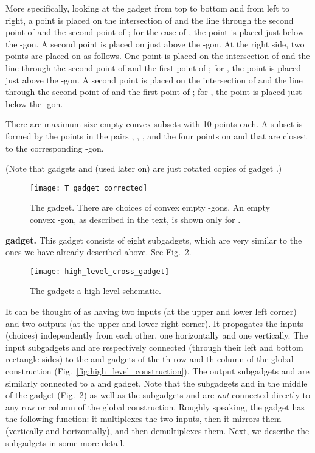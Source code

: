 \documentclass[11pt,a4paper]{article}
\begin{document}
More specifically, looking at the gadget from top to bottom and from left to right, a point is placed on the intersection of  and the line through the second point of  and the second point of ; for the case of , the point is placed just below the -gon. A second point is placed on  just above the -gon. At the right side, two points are placed on  as follows. One point is placed on the intersection of  and the line through the second point of  and the first point of ; for , the point is placed just above the -gon. A second point is placed on the intersection of  and the line through the second point of  and the first point of ; for , the point is placed just below the -gon.

There are  maximum size empty convex subsets with 10 points each. A subset is formed by the points in the pairs , , , and the four points on  and  that are closest to the corresponding -gon. 

(Note that gadgets  and  (used later on) are just rotated copies of gadget .)
\begin{figure}
\centering
	\texttt{[image: T\_gadget\_corrected]}
	\caption{The  gadget. There are  choices of convex empty -gons. An empty convex -gon, as described in the text, is shown only for .}
	\label{fig:T_gadget}
\end{figure}

\medskip
\noindent
{ \textbf{gadget.}} This gadget consists of eight subgadgets, which are very similar to the ones we have already described above. See Fig.~\ref{fig:high_level_cross_gadget}.
\begin{figure}[h]
\centering
	\texttt{[image: high\_level\_cross\_gadget]}
	\caption{The  gadget: a high level schematic.}
	\label{fig:high_level_cross_gadget}
\end{figure}
It can be thought of as having two inputs (at the upper and lower left corner) and two outputs (at the upper and lower right corner). It propagates the inputs (choices) independently from each other, one horizontally and one vertically. The input subgadgets  and  are respectively connected (through their left and bottom rectangle sides) to the  and  gadgets of the th row and th column of the global construction (Fig.~\ref{fig:high_level_construction}). The output subgadgets  and  are similarly connected to a  and  gadget. Note that the subgadgets  and  in the middle of the  gadget (Fig.~\ref{fig:high_level_cross_gadget}) as well as the subgadgets  and  are \emph{not} connected directly to any row or column of the global construction. Roughly speaking, the  gadget has the following function: it multiplexes the two inputs, then it mirrors them (vertically and horizontally), and then demultiplexes them. 
Next, we describe the subgadgets in some more detail.
\end{document}
